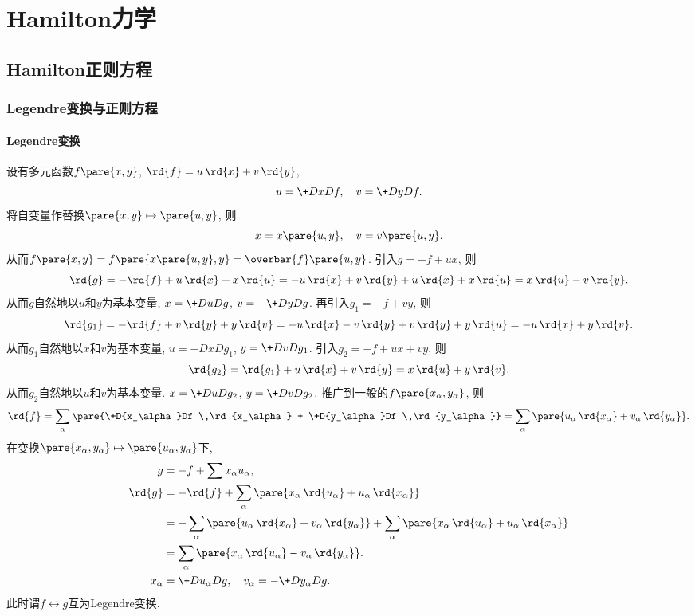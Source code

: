 \documentclass[../LectureNotes.tex]{subfiles}
\begin{document}
\section{Hamilton力学} %
\label{sec:hamilton力学}

\subsection{Hamilton正则方程} %
\label{sub:hamilton正则方程}

\subsubsection{Legendre变换与正则方程} %
\label{ssub:legendre变换与正则方程}

\paragraph{Legendre变换} %
\label{par:legendre变换}

设有多元函数$f\pare{x,y}$, $\rd{f} = u\,\rd{x} + v\,\rd{y}$,
\[ u = \+DxDf, \quad v = \+DyDf. \]
将自变量作替换$\pare{x,y}\mapsto \pare{u,y}$, 则
\[ x = x\pare{u,y},\quad v = v\pare{u,y}. \]
从而$f\pare{x,y} = f\pare{x\pare{u,y},y} = \overbar{f}\pare{u,y}$. 引入$g = -f+ux$, 则
\[ \rd{g} = -\rd{f} + u\,\rd{x} + x\,\rd{u} = -u\,\rd{x} + v\,\rd{y} + u\,\rd{x} + x\,\rd{u} = x\,\rd{u} - v\,\rd{y}. \]
从而$g$自然地以$u$和$y$为基本变量, $\displaystyle x = \+DuDg$, $\displaystyle v = -\+DyDg$. 再引入$g_1 = -f+vy$, 则
\[ \rd{g_1} = -\rd{f} + v\,\rd{y} + y\,\rd{v} = -u\,\rd{x} - v\,\rd{y} + v\,\rd{y} + y\,\rd{u} = -u\,\rd{x} + y\,\rd{v} .\]
从而$g_1$自然地以$x$和$v$为基本变量, $\displaystyle u = -DxD{g_1}$, $\displaystyle y = \+DvD{g_1}$. 引入$g_2 = -f+ux+vy$, 则
\[ \rd{g_2} = \rd{g_1} + u\,\rd{x} + v\,\rd{y} = x\,\rd{u} + y\,\rd{v}. \]
从而$g_2$自然地以$u$和$v$为基本变量. $\displaystyle x = \+DuD{g_2}$, $\displaystyle y = \+DvD{g_2}$. 推广到一般的$f\pare{x_\alpha,y_\alpha}$, 则
\[ \rd{f} = \sum_\alpha \pare{\+D{x_\alpha}Df \,\rd{x_\alpha} + \+D{y_\alpha}Df \,\rd{y_\alpha}} = \sum_\alpha \pare{u_\alpha\,\rd{x_\alpha} + v_\alpha\,\rd{y_\alpha}}. \]
在变换$\pare{x_\alpha,y_\alpha}\mapsto \pare{u_\alpha,y_\alpha}$下,
\begin{align*}
    g &= -f + \sum x_\alpha u_\alpha, \\
    \rd{g} &= -\rd{f} + \sum_\alpha \pare{x_\alpha \,\rd{u_\alpha} + u_\alpha\,\rd{x_\alpha}} \\
    &= -\sum_\alpha \pare{u_\alpha\,\rd{x_\alpha} + v_\alpha \,\rd{y_\alpha}} + \sum_\alpha \pare{x_\alpha\,\rd{u_\alpha} + u_\alpha\,\rd{x_\alpha}} \\
    &= \sum_\alpha \pare{x_\alpha\,\rd{u_\alpha} - v_\alpha\,\rd{y_\alpha}}. \\
    x_\alpha &= \+D{u_\alpha}Dg,\quad v_\alpha = -\+D{y_\alpha}Dg.
\end{align*}
此时谓$f\leftrightarrow g$互为Legendre变换.
\end{document}
